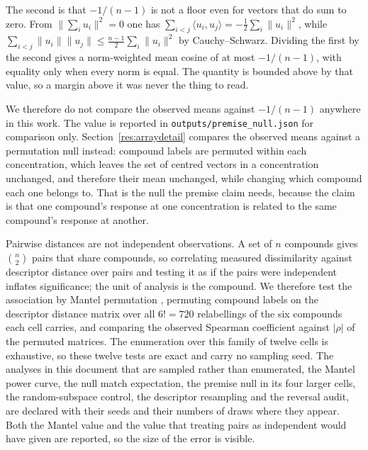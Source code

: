 \documentclass[journal=jacsat,manuscript=suppinfo,margin=1in]{achemso}
\begin{document}
The second is that $-1/(n-1)$ is not a floor even for vectors that do sum to
zero. From $\lVert\sum_i u_i\rVert^2 = 0$ one has
$\sum_{i<j}\langle u_i, u_j\rangle = -\tfrac{1}{2}\sum_i \lVert u_i\rVert^2$,
while $\sum_{i<j}\lVert u_i\rVert\lVert u_j\rVert \le
\tfrac{n-1}{2}\sum_i \lVert u_i\rVert^2$ by Cauchy--Schwarz. Dividing the
first by the second gives a norm-weighted mean cosine of at most $-1/(n-1)$,
with equality only when every norm is equal. The quantity is bounded above by
that value, so a margin above it was never the thing to read.

We therefore do not compare the observed means against $-1/(n-1)$ anywhere in
this work. The value is reported in
\texttt{outputs/premise\_null.json} for comparison only.
Section~\ref{res:arraydetail} compares the observed means against a
permutation null instead: compound labels are permuted within each
concentration, which leaves the set of centred vectors in a concentration
unchanged, and therefore their mean unchanged, while changing which compound
each one belongs to. That is the null the premise claim needs, because the
claim is that one compound's response at one concentration is related to the
same compound's response at another.

Pairwise distances are not independent observations. A set of $n$ compounds
gives $\binom{n}{2}$ pairs that share compounds, so correlating measured
dissimilarity against descriptor distance over pairs and testing it as if the
pairs were independent inflates significance; the unit of analysis is the
compound. We therefore test the association by Mantel permutation
\cite{mantel1967}, permuting compound labels on the descriptor distance matrix
over all $6! = 720$ relabellings of the six compounds each cell carries, and
comparing the observed Spearman
coefficient against $|\rho|$ of the permuted matrices. The enumeration over
this family of twelve cells is exhaustive, so these twelve tests are exact and
carry no sampling seed. %
The analyses in this document that are sampled rather
than enumerated, the Mantel power curve, the null match expectation, the
premise null in its four larger cells, the random-subspace control, the
descriptor resampling and the reversal audit, are declared with their seeds and
their numbers of draws where they appear. Both the Mantel value and
the value that treating pairs as independent would have given are reported, so
the size of the error is visible.
\end{document}
